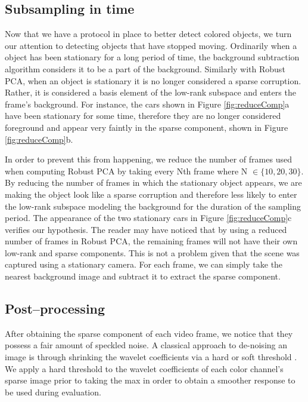 \documentclass{article}
\begin{document}
\subsection{Subsampling in time}

Now that we have a protocol in place to better detect colored objects, we turn our attention to detecting objects that have stopped moving. Ordinarily when a object has been stationary for a long period of time, the background subtraction algorithm considers it  to be a part of the background. Similarly with  Robust PCA, when an object is stationary it is no longer considered a sparse corruption. Rather, it is considered a basis element of the low-rank subspace and enters the frame's background. For instance, the cars shown in Figure \ref{fig:reduceComp}a have been stationary for some time, therefore they are no longer considered foreground and appear very faintly in the sparse component, shown in Figure \ref{fig:reduceComp}b.
 
In order to prevent this from happening, we reduce the number of frames used when computing Robust PCA by taking every Nth frame where N $\in \{ 10, 20, 30\}$. By reducing the number of frames in which the stationary object appears, we are making the object look like a sparse corruption and therefore less likely to enter the low-rank subspace modeling the background for the duration of the sampling period. The appearance of the two stationary cars in Figure \ref{fig:reduceComp}c verifies our hypothesis. The reader may have noticed that by using a reduced number of frames in Robust PCA, the remaining frames will not have their own low-rank and sparse components. This is not a problem given that the scene was captured using a stationary camera. For each frame, we can simply take the nearest background image and subtract it to extract the sparse component.

\subsection{Post--processing}

After obtaining the sparse component of each video frame, we notice that they possess a fair amount of speckled noise. A classical approach to de-noising an image is through shrinking the wavelet coefficients via a hard or soft threshold \cite{Donoho95}. We apply a hard threshold to the wavelet coefficients of each color channel's sparse image prior to taking the max in order to obtain a smoother response to be used during evaluation.
\end{document}
